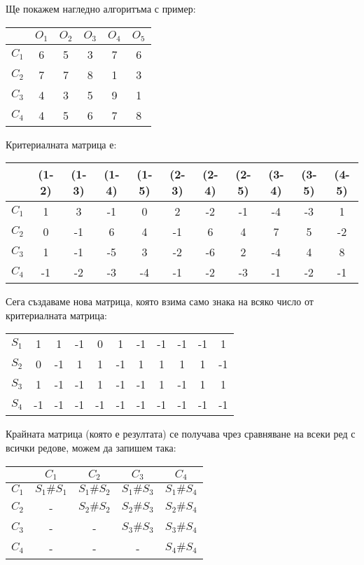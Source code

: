 \documentclass{beamer}
\begin{document}
\begin{frame}
Ще покажем нагледно алгоритъма с пример:
\begin{center}
\begin{tabular}{c|ccccc}
& $O_1$ & $O_2$ & $O_3$ & $O_4$ & $O_5$ \\
\hline $C_1$ & 6 & 5 & 3 & 7 & 6 \\
$C_2$ & 7 & 7 & 8 & 1 & 3 \\
$C_3$ & 4 & 3 & 5 & 9 & 1 \\
$C_4$ & 4 & 5 & 6 & 7 & 8 \\
\end{tabular}
\end{center}

Критериалната матрица е:
\begin{center}
\begin{tabular}{c|cccccccccc}
& {\tiny (1-2)} & {\tiny (1-3)} & {\tiny (1-4)} & {\tiny (1-5)} &
{\tiny (2-3)} & {\tiny (2-4)} & {\tiny (2-5)} & {\tiny (3-4)} & {\tiny (3-5)} & {\tiny (4-5)} \\
\hline $C_1$ & 1 & 3 & -1 & 0 & 2 & -2 & -1 & -4 & -3 & 1 \\
$C_2$ & 0 & -1 & 6 & 4 & -1 & 6 & 4 & 7 & 5 & -2 \\
$C_3$ & 1 & -1 & -5 & 3 & -2 & -6 & 2 & -4 & 4 & 8 \\
$C_4$ & -1 & -2 & -3 & -4 & -1 & -2 & -3 & -1 & -2 & -1
\end{tabular}
\end{center}
\end{frame}


\begin{frame}
Сега създаваме нова матрица, която взима само знака на всяко число от критериалната матрица:
\begin{center}
\begin{tabular}{c|cccccccccc}
& & & & & & & & & & \\
\hline $S_1$ & 1 & 1 & -1 & 0 & 1 & -1 & -1 & -1 & -1 & 1 \\
$S_2$ & 0 & -1 & 1 & 1 & -1 & 1 & 1 & 1 & 1 & -1 \\
$S_3$ & 1 & -1 & -1 & 1 & -1 & -1 & 1 & -1 & 1 & 1 \\
$S_4$ & -1 & -1 & -1 & -1 & -1 & -1 & -1 & -1 & -1 & -1
\end{tabular}
\end{center}

Крайната матрица (която е резултата) се получава чрез сравняване на всеки ред с всички редове,
можем да запишем така:
\begin{center}
\begin{tabular}{c|cccc}
& $C_1$ & $C_2$ & $C_3$ & $C_4$ \\
\hline $C_1$ & $S_1\#S_1$ & $S_1\#S_2$ & $S_1\#S_3$ & $S_1\#S_4$ \\
$C_2$ & - & $S_2\#S_2$ & $S_2\#S_3$ & $S_2\#S_4$ \\
$C_3$ & - & - & $S_3\#S_3$ & $S_3\#S_4$ \\
$C_4$ & - & - & - & $S_4\#S_4$
\end{tabular}
\end{center}
\end{frame}
\end{document}
